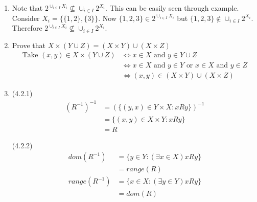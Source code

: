 \begin{enumerate}
    (2.13.5) Consider:\\
    \begin{align*}
        (X \cup Y) \setminus (X \cap Y) &= ((X \cup Y) \setminus X) \cup ((X \cup Y) \ Y)\\
        &= (Y \setminus X) \cup (X \setminus Y)\\
        &= X \vartriangle Z\\
        \therefore X \vartriangle Y = (X \cup Y) \setminus (X \cap Y)
    \end{align*}

    \item Note that $2^{\cup_{i \in I} X_{i}} \nsubseteq \cup_{i \in I} 2^{X_{i}}$. This can be easily seen through example. Consider $X_{i} = \{\{1,2\},\{3\}\}$. Now $\{1,2,3\} \in 2^{\cup_{i \in I} X_{i}}$ but $\{1,2,3\} \notin \cup_{i \in I} 2^{X_{i}}$. Therefore $2^{\cup_{i \in I} X_{i}} \nsubseteq \cup_{i \in I} 2^{X_{i}}$.

    \item Prove that $X\times(Y \cup Z) = (X \times Y) \cup (X \times Z)$\\
        \begin{align*}
            \text{Take } (x,y) \in X \times (Y \cup Z) &\Leftrightarrow x \in X \text{ and } y \in Y \cup Z\\
            &\Leftrightarrow x \in X \text{ and } y \in Y \text{ or } x \in X \text{ and } y \in Z\\
            &\Leftrightarrow (x,y) \in  (X \times Y) \cup (X \times Z)
        \end{align*}

    \item 
    (4.2.1)
    \begin{align*}
        (R^{-1})^{-1} &= (\{(y,x) \in Y \times X : xRy\})^{-1}\\
        &=\{(x,y) \in X \times Y : xRy\}\\
        &=R
    \end{align*}

    (4.2.2)\\
    \begin{align*}
        dom(R^{-1}) &= \{y \in Y : (\exists x \in X) xRy\}\\
        &= range(R)\\
        range(R^{-1}) &= \{x \in X : (\exists y \in Y) xRy\}\\
        &= dom(R)    
    \end{align*}

\end{enumerate}
